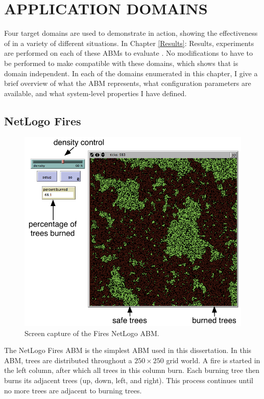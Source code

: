 \chapter{APPLICATION DOMAINS}
\thispagestyle{plain}

\label{Domains}


Four target domains are used to demonstrate \fw in action,  showing the effectiveness of \fw in a variety of different situations.
In Chapter \ref{Results}: Results, experiments are performed on each of these ABMs to evaluate \fw.
No modifications to \fw have to be performed to make \fw compatible with these domains, which shows that \fw is domain independent.
In each of the domains enumerated in this chapter, I give a brief overview of what the ABM represents, what configuration parameters are available, and what system-level properties I have defined.

\section{NetLogo Fires}\label{sec:Fires}

\begin{figure}[ht]
\centering
\includegraphics[scale=1]{images/fires_ui.pdf}
\caption{Screen capture of the Fires NetLogo ABM.}
\label{fig:firesui}
\end{figure}

The NetLogo Fires ABM is the simplest ABM used in this dissertation.
In this ABM, trees are distributed throughout a $250 \times 250$ grid world.
A fire is started in the left column, after which all trees in this column burn.
Each burning tree then burns its adjacent trees (up, down, left, and right).
This process continues until no more trees are adjacent to burning trees.

